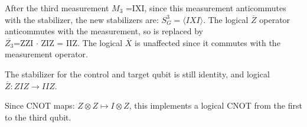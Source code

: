 After the third measurement $M_{3}$ =IXI, since this measurement
anticommutes with the stabilizer, the new stabilizers are:
$S^{3}_{G}= \langle IXI \rangle$. The logical $\overline{Z}$
operator anticommutes with the measurement, so is replaced by\\
$ \overline{Z_{3}} $=ZZI $\cdot$ ZIZ = IIZ\@. The logical 
$ \overline{X} $ is unaffected since it commutes with the
measurement operator. 

The stabilizer for the control and target qubit is still
identity, and logical $\overline{Z}: ZIZ \rightarrow IIZ$.

Since CNOT maps: $Z\otimes Z \mapsto I \otimes Z$, this 
implements a logical CNOT from the first to the third qubit.

